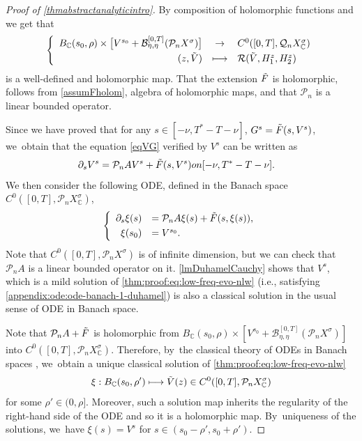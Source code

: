 \documentclass[11pt]{article}
\providecommand{\dpl}{\displaystyle}
\newcommand{\ie}{i.e.,\xspace}
\newcommand\mto{\mathchoice{\longmapsto}{\mapsto}{\mapsto}{\mapsto}}
\theoremstyle{definition}
\let\mc\mathcal
\newcommand{\B}{\mc{B}}
\newcommand{\Q}{\mathcal{Q}}
\renewcommand{\P}{\mathcal{P}}
\begin{document}
\begin{proof}[Proof of \cref{thmabstractanalyticintro}]
By composition of holomorphic functions and \cite[Prop.\,8.10]{Muj86} we get that
\begin{align*}
\left\{\begin{array}{rcl}
B_{\mathbb{C}}(s_0, \rho)\times \bigl[V^{s_0}+\B_{\eta,\eta}^{[0,T]}(\P_n X^{\sigma})\bigr]&\dpl\to& C^0([0, T], \Q_n X_\mathbb{C}^\sigma)\\[3pt]
(z,\Tilde{V})&\dpl\mto& \mathcal{R}(\Tilde{V},H_{1}^z,H_{2}^z)
\end{array}\right.
\end{align*}
is a well-defined and holomorphic map. That the extension $\Tilde{F}$ is holomorphic, follows from \cref{assumFholom}, algebra of holomorphic maps, and that $\P_n$ is a linear bounded operator.

Since we have proved that for any $s\in [-\nu, T^*-T-\nu]$, $G^s=\Tilde{F}(s,V^s)$, we~obtain that the equation \eqref{eqVG} verified by $V^s$ can be written as
\begin{align*}
\partial_s V^s=\P_n AV^s+\Tilde{F}(s,V^s)& \textnormal{ on } [-\nu, T^*-T-\nu].
\end{align*}
We then consider the following ODE, defined in the Banach space $C^0([0, T], \P_n X_\mathbb{C}^\sigma)$,
\begin{align}\label{thm:proof:eq:low-freq-evo-nlw}
\left\{\begin{array}{rl}
\partial_s \xi(s)&=\P_nA\xi(s)+\Tilde{F}(s, \xi(s)), \\[3pt]
\xi(s_0)&=V^{s_0}.
\end{array}\right.
\end{align}
Note that $C^0([0,T], \P_n X^\sigma)$ is of infinite dimension, but we can check that $\P_n A$ is a linear bounded operator on it. \cref{lmDuhamelCauchy} shows that $V^s$, which is a mild solution of \eqref{thm:proof:eq:low-freq-evo-nlw} (\ie satisfying \eqref{appendix:ode:ode-banach-1-duhamel}) is also a classical solution in the usual sense of ODE in Banach space.

Note that $\P_n A+\Tilde{F}$ is holomorphic from $ B_{\mathbb{C}}(s_0, \rho)\times \left[V^{s_0}+ \B_{\eta,\eta}^{[0,T]}(\P_n X^{\sigma})\right]$ into $C^0([0, T], \P_n X_{\mathbb{C}}^\sigma)$. Therefore, by~the classical theory of ODEs in Banach spaces \cite[Th.\,10.4.5]{1969:dieudonne:modern-analysis}, we~obtain a unique classical solution of \eqref{thm:proof:eq:low-freq-evo-nlw}
\begin{align*}
\xi:B_{\mathbb{C}}(s_0, \rho')\mto \Tilde{V}(z)\in C^0([0,T], \P_n X_{\mathbb{C}}^\sigma)
\end{align*}
for some $\rho'\in (0, \rho]$. Moreover, such a solution map inherits the regularity of the right-hand side of the ODE and so it is a holomorphic map. By~uniqueness of the solutions, we~have $\xi(s)=V^s$ for $s\in (s_0-\rho',s_0+\rho')$.


\end{proof}
\end{document}
